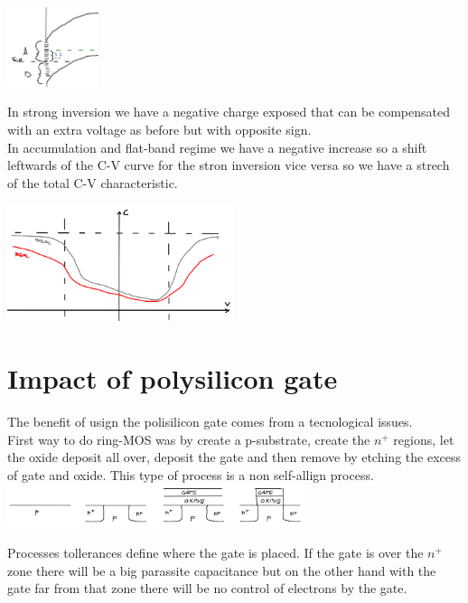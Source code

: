 \centering
\includegraphics[width=0.2\textwidth]{istasi.png}\\
\raggedright

In strong inversion we have a negative charge exposed that can be compensated with an extra voltage as before but with opposite sign.\\
In accumulation and flat-band regime we have a negative increase so a shift leftwards of the C-V curve for the stron inversion vice versa so we have a strech of the total C-V characteristic.

\centering
\includegraphics[width=0.5\textwidth]{cvis.png}\\
\raggedright

\section{Impact of polysilicon gate}

The benefit of usign the polisilicon gate comes from a tecnological issues.\\
First way to do ring-MOS was by create a p-substrate, create the $n^+$ regions, let the oxide deposit all over, deposit the gate and then remove by etching the excess of gate and oxide. This type of process is a non self-allign process.\\

\centering
\includegraphics[width=0.65\textwidth]{process1.png}\\
\raggedright

Processes tollerances define where the gate is placed. If the gate is over the $n^+$ zone there will be a big parassite capacitance but on the other hand with the gate far from that zone there will be no control of electrons by the gate.

